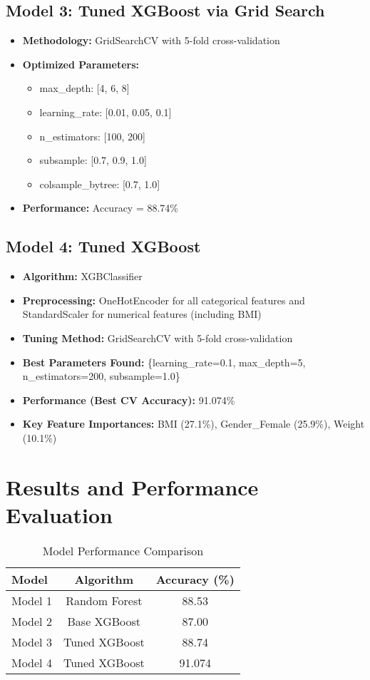 \documentclass[12pt,a4paper]{report}
\begin{document}
\section{Model 3: Tuned XGBoost via Grid Search}
\begin{itemize}
    \item \textbf{Methodology:} GridSearchCV with 5-fold cross-validation
    \item \textbf{Optimized Parameters:} 
    \begin{itemize}
        \item max\_depth: [4, 6, 8]
        \item learning\_rate: [0.01, 0.05, 0.1]
        \item n\_estimators: [100, 200]
        \item subsample: [0.7, 0.9, 1.0]
        \item colsample\_bytree: [0.7, 1.0]
    \end{itemize}
    \item \textbf{Performance:} Accuracy = 88.74\%
\end{itemize}

\section{Model 4: Tuned XGBoost}
\begin{itemize}
    \item \textbf{Algorithm:} XGBClassifier
    \item \textbf{Preprocessing:} OneHotEncoder for all categorical features and StandardScaler for numerical features (including BMI)
    \item \textbf{Tuning Method:} GridSearchCV with 5-fold cross-validation
    \item \textbf{Best Parameters Found:} \{learning\_rate=0.1, max\_depth=5, n\_estimators=200, subsample=1.0\}
    \item \textbf{Performance (Best CV Accuracy):} 91.074\%
    \item \textbf{Key Feature Importances:} BMI (27.1\%), Gender\_Female (25.9\%), Weight (10.1\%)
\end{itemize}

\chapter{Results and Performance Evaluation}

\begin{table}[H]
\centering
\caption{Model Performance Comparison}
\begin{tabular}{lcc}
\toprule
\textbf{Model} & \textbf{Algorithm} & \textbf{Accuracy (\%)} \\
\midrule
Model 1 & Random Forest & 88.53 \\
Model 2 & Base XGBoost & 87.00 \\
Model 3 & Tuned XGBoost & 88.74 \\
Model 4 & Tuned XGBoost & 91.074 \\
\bottomrule
\end{tabular}
\end{table}
\end{document}
